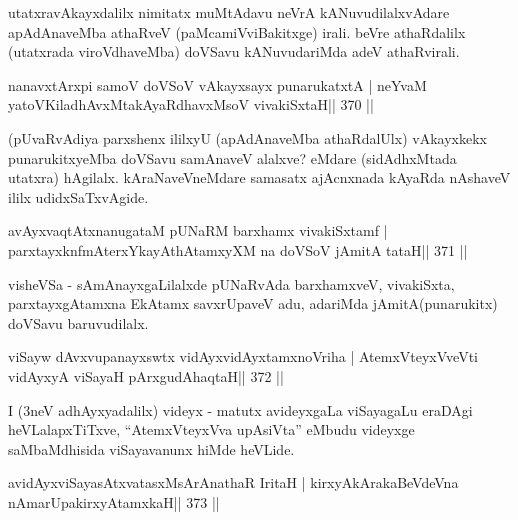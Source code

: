 \begin{artha}
utatxravAkayxdalilx nimitatx muMtAdavu neVrA kANuvudilalxvAdare  apAdAnaveMba athaRveV (paMcamiVviBakitxge) irali. beVre athaRdalilx  (utatxrada viroVdhaveMba) doVSavu kANuvudariMda adeV athaRvirali.
\end{artha}

\begin{shl}
nanavxtArxpi samoV doVSoV vAkayxsayx punarukatxtA |
neYvaM yatoV\s KiladhAvxMtakAyaRdhavxMsoV vivakiSxtaH\hfill || 370 ||
\end{shl}

\begin{artha}
(pUvaRvAdiya parxshenx  \mdash  ililxyU (apAdAnaveMba athaRdalUlx) 
vAkayxkekx punarukitxyeMba doVSavu samAnaveV alalxve?  \mdash  eMdare 
(sidAdhxMtada utatxra) hAgilalx. kAraNaveVneMdare samasatx ajAcnxnada 
kAyaRda nAshaveV ililx udidxSaTxvAgide.
\end{artha}


\begin{shl}
avAyxvaqtAtxnanugataM pUNaRM barxhamx vivakiSxtamf |
parxtayxknfmAterxYkayAthAtamxyXM na doVSoV jAmitA tataH\hfill || 371 ||
\end{shl}

\begin{artha}
visheVSa - sAmAnayxgaLilalxde pUNaRvAda barxhamxveV, vivakiSxta, parxtayxgAtamxna EkAtamx savxrUpaveV adu, adariMda jAmitA(punarukitx) doVSavu baruvudilalx.
\end{artha}


\begin{shl}
viSayw dAvxvupanayxswtx vidAyxvidAyxtamxnoVriha |
AtemxVteyxVveVti vidAyxyA viSayaH pArxgudAhaqtaH\hfill || 372 ||
\end{shl}

\begin{artha}
I (3neV adhAyxyadalilx) videyx - matutx avideyxgaLa viSayagaLu eraDAgi heVLalapxTiTxve, ``AtemxVteyxVva upAsiVta'' eMbudu videyxge saMbaMdhisida viSayavanunx hiMde heVLide.
\end{artha}

\begin{shl}
avidAyxviSayasAtxvatasxMsArAnathaR IritaH |
kirxyAkArakaBeVdeVna nAmarUpakirxyAtamxkaH\hfill || 373 ||
\end{shl}

